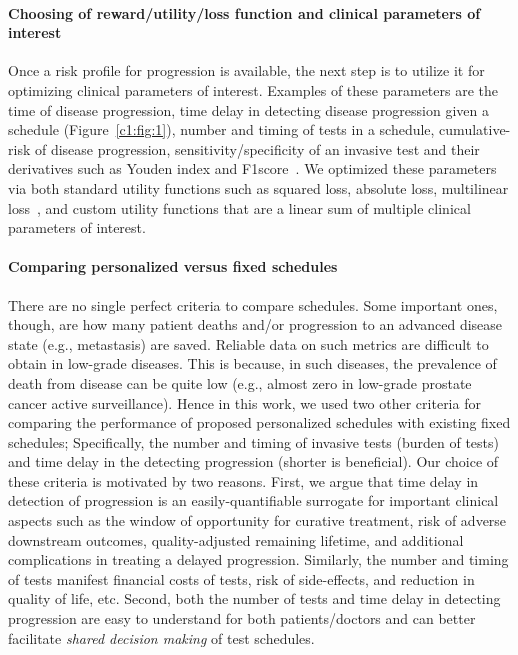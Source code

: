 \paragraph{Choosing of reward/utility/loss function and clinical parameters of interest} Once a risk profile for progression is available, the next step is to utilize it for optimizing clinical parameters of interest. Examples of these parameters are the time of disease progression, time delay in detecting disease progression given a schedule (Figure~\ref{c1:fig:1}), number and timing of tests in a schedule, cumulative-risk of disease progression, sensitivity/specificity of an invasive test and their derivatives such as Youden index and F1score~\citep{lopez2014optimalcutpoints}. We optimized these parameters via both standard utility functions such as squared loss, absolute loss, multilinear loss~\citep{robertBayesianChoice}, and custom utility functions that are a linear sum of multiple clinical parameters of interest.

\paragraph{Comparing personalized versus fixed schedules} There are no single perfect criteria to compare schedules. Some important ones, though, are how many patient deaths and/or progression to an advanced disease state (e.g., metastasis) are saved. Reliable data on such metrics are difficult to obtain in low-grade diseases. This is because, in such diseases, the prevalence of death from disease can be quite low (e.g., almost zero in low-grade prostate cancer active surveillance). Hence in this work, we used two other criteria for comparing the performance of proposed personalized schedules with existing fixed schedules; Specifically, the number and timing of invasive tests (burden of tests) and time delay in the detecting progression (shorter is beneficial). Our choice of these criteria is motivated by two reasons. First, we argue that time delay in detection of progression is an easily-quantifiable surrogate for important clinical aspects such as the window of opportunity for curative treatment, risk of adverse downstream outcomes, quality-adjusted remaining lifetime, and additional complications in treating a delayed progression. Similarly, the number and timing of tests manifest financial costs of tests, risk of side-effects, and reduction in quality of life, etc. Second, both the number of tests and time delay in detecting progression are easy to understand for both patients/doctors and can better facilitate \emph{shared decision making} of test schedules.

